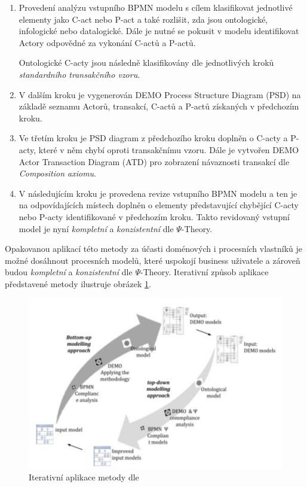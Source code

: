 \documentclass[]{article}
\begin{document}
\begin{enumerate}
\item Provedení analýzu vstupního BPMN modelu s cílem klasifikovat jednotlivé elementy jako C-act nebo P-act a také rozlišit, zda jsou ontologické, infologické nebo datalogické. Dále je nutné se pokusit v modelu identifikovat Actory odpovědné za vykonání C-actů a P-actů.

Ontologické C-acty jsou následně klasifikovány dle jednotlivých kroků \textit{standardního transakčního vzoru}.
\item V dalším kroku je vygenerován DEMO Process Structure Diagram (PSD) na základě seznamu Actorů, transakcí, C-actů a P-actů získaných v předchozím kroku.
\item Ve třetím kroku je PSD diagram z předchozího kroku doplněn o C-acty a P-acty, které v něm chybí oproti transakčnímu vzoru. Dále je vytvořen DEMO Actor Transaction Diagram (ATD) pro zobrazení návaznosti transakcí dle \textit{Composition axiomu}.
\item V následujícím kroku je provedena revize vstupního BPMN modelu a ten je na odpovídajících místech doplněn o elementy představující chybějící C-acty nebo P-acty identifikované v předchozím kroku. Takto revidovaný vstupní model je nyní \textit{kompletní} a \textit{konzistentní} dle $\Psi$-Theory.
\end{enumerate}

Opakovanou aplikací této metody za účasti doménových i procesních vlastníků je možné dosáhnout procesních modelů, které uspokojí business uživatele a zároveň budou \textit{kompletní} a \textit{konzistentní} dle $\Psi$-Theory. Iterativní způsob aplikace představené metody ilustruje obrázek \ref{fig:caetano-bpmn-demo-method}.

\begin{figure}[H]\centering
\includegraphics[width=\textwidth,height=\textheight,keepaspectratio]{obrazky/caetano-bpmn-demo-method}
\caption{Iterativní aplikace metody dle \cite{Caetano2011}}
\label{fig:caetano-bpmn-demo-method}
\end{figure}
\end{document}
